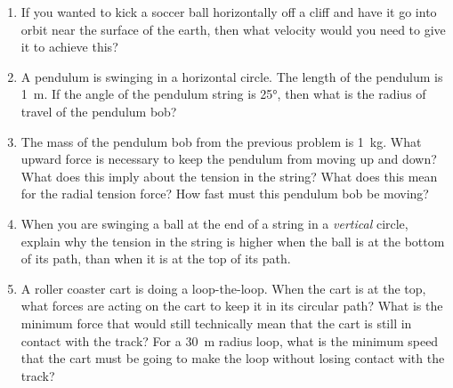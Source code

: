 \begin{enumerate}
	\item If you wanted to kick a soccer ball horizontally off a cliff and have it go into orbit near the surface of the earth, then what velocity would you need to give it to achieve this?
	
	\item A pendulum is swinging in a horizontal circle. The length of the pendulum is \SI{1}{m}. If the angle of the pendulum string is \ang{25}, then what is the radius of travel of the pendulum bob?
	
	\item The mass of the pendulum bob from the previous problem is \SI{1}{kg}. What upward force is necessary to keep the pendulum from moving up and down? What does this imply about the tension in the string? What does this mean for the radial tension force? How fast must this pendulum bob be moving?
	
	\bigskip
	\item When you are swinging a ball at the end of a string in a \emph{vertical} circle, explain why the tension in the string is higher when the ball is at the bottom of its path, than when it is at the top of its path.
	\bigskip
	
	\item A roller coaster cart is doing a loop-the-loop. When the cart is at the top, what forces are acting on the cart to keep it in its circular path? What is the minimum force that would still technically mean that the cart is still in contact with the track? For a \SI{30}{m} radius loop, what is the minimum speed that the cart must be going to make the loop without losing contact with the track?   
	
\end{enumerate}